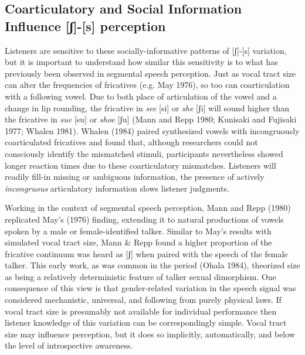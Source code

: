 \documentclass[
  letterpaper,
  DIV=11,
  numbers=noendperiod]{scrartcl}
\begin{document}
\subsection{Coarticulatory and Social Information Influence
{[}ʃ{]}-{[}s{]}
perception}\label{coarticulatory-and-social-information-influence-ux283-s-perception}

Listeners are sensitive to these socially-informative patterns of
{[}ʃ{]}-{[}s{]} variation, but it is important to understand how similar
this sensitivity is to what has previously been observed in segmental
speech perception. Just as vocal tract size can alter the frequencies of
fricatives (e.g. May 1976), so too can coarticulation with a following
vowel. Due to both place of articulation of the vowel and a change in
lip rounding, the fricative in \emph{see} {[}si{]} or \emph{she}
{[}ʃi{]} will sound higher than the fricative in \emph{sue} {[}su{]} or
\emph{shoe} {[}ʃu{]} (Mann and Repp 1980; Kunisaki and Fujisaki 1977;
Whalen 1981). Whalen (1984) paired synthesized vowels with incongruously
coarticulated fricatives and found that, although researchers could not
consciously identify the mismatched stimuli, participants nevertheless
showed longer reaction times due to these coarticulatory mismatches.
Listeners will readily fill-in missing or ambiguous information, the
presence of actively \emph{incongruous} articulatory information slows
listener judgments.

Working in the context of segmental speech perception, Mann and Repp
(1980) replicated May's (1976) finding, extending it to natural
productions of vowels spoken by a male or female-identified talker.
Similar to May's results with simulated vocal tract size, Mann \& Repp
found a higher proportion of the fricative continuum was heard as
{[}ʃ{]} when paired with the speech of the female talker. This early
work, as was common in the period (Ohala 1984), theorized size as being
a relatively deterministic feature of talker sexual dimorphism. One
consequence of this view is that gender-related variation in the speech
signal was considered mechanistic, universal, and following from purely
physical laws. If vocal tract size is presumably not available for
individual performance then listener knowledge of this variation can be
correspondingly simple. Vocal tract size may influence perception, but
it does so implicitly, automatically, and below the level of
introspective awareness.
\end{document}
